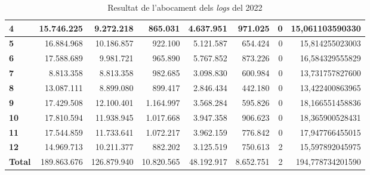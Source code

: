 \begin{table}[h!]
\begin{adjustbox}{width=1.5\textwidth, center}
\begin{tabular}{|l|r|r|r|r|r|r|r|}
            \textbf{4}     & 15.746.225  & 9.272.218   & 865.031    & 4.637.951  & 971.025   & 0 & 15,061103590330  \\
            \midrule
            \textbf{5}     & 16.884.968  & 10.186.857  & 922.100    & 5.121.587  & 654.424   & 0 & 15,814255023003  \\
            \textbf{6}     & 17.588.689  & 9.981.721   & 965.890    & 5.767.852  & 873.226   & 0 & 16,584329555829  \\
            \textbf{7}     & 8.813.358   & 8.813.358   & 982.685    & 3.098.830  & 600.984   & 0 & 13,731757827600  \\
            \textbf{8}     & 13.087.111  & 8.899.080   & 899.417    & 2.846.434  & 442.180   & 0 & 13,422400863965  \\
            \midrule
            \textbf{9}     & 17.429.508  & 12.100.401  & 1.164.997  & 3.568.284  & 595.826   & 0 & 18,166551458836  \\
            \textbf{10}    & 17.810.594  & 11.938.945  & 1.017.668  & 3.947.358  & 906.623   & 0 & 18,365900528431  \\
            \textbf{11}    & 17.544.859  & 11.733.641  & 1.072.217  & 3.962.159  & 776.842   & 0 & 17,947766455015  \\
            \textbf{12}    & 14.969.713  & 10.211.377  & 882.202    & 3.125.519  & 750.613   & 2 & 15,597892045975  \\
            \midrule
            \textbf{Total} & 189.863.676 & 126.879.940 & 10.820.565 & 48.192.917 & 8.652.751 & 2 & 194,778734201590 \\
            \bottomrule
        \end{tabular}
    \end{adjustbox}
    \caption{Resultat de l'abocament dels \textit{logs} del 2022}
    \label{tab:logs-table-2022}
\end{table}

